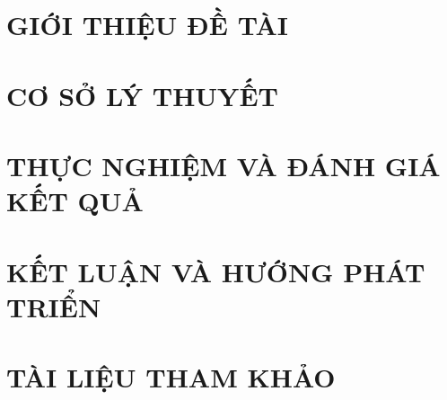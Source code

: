 \documentclass[a4paper,13pt,3p,twoside]{report}
\renewcommand{\bibname}{Danh_sach_tai_lieu_tham_khao}
\theoremstyle{definition}
\begin{document}
\glsaddall 
 \renewcommand*{\glossaryname}{Danh sách thuật ngữ}
\renewcommand*{\acronymname}{DANH MỤC THUẬT NGỮ VÀ TỪ VIẾT TẮT}
\renewcommand*{\entryname}{Thuật ngữ}
\renewcommand*{\descriptionname}{Ý nghĩa}
\printnoidxglossaries


% 


\newpage
{}

\pagestyle{fancy}
\fancyhf{}
\fancyhead[RE, LO]{\leftmark}
\fancyfoot[RE, LO]{\thepage}

\chapter{GIỚI THIỆU ĐỀ TÀI}
\label{chapter:Introduction}

\newpage
\chapter{CƠ SỞ LÝ THUYẾT}
\label{chapter:Related_works}


\newpage
\chapter{THỰC NGHIỆM VÀ ĐÁNH GIÁ KẾT QUẢ} %
\label{chapter:Experiment}


\newpage
\chapter{KẾT LUẬN VÀ HƯỚNG PHÁT TRIỂN} %
\label{chapter:conclusion}


\newpage
\chapter*{TÀI LIỆU THAM KHẢO} %
\label{chapter:reference}



\newpage
\renewcommand\bibname{TÀI LIỆU THAM KHẢO}
\printbibliography
{}
\end{document}
